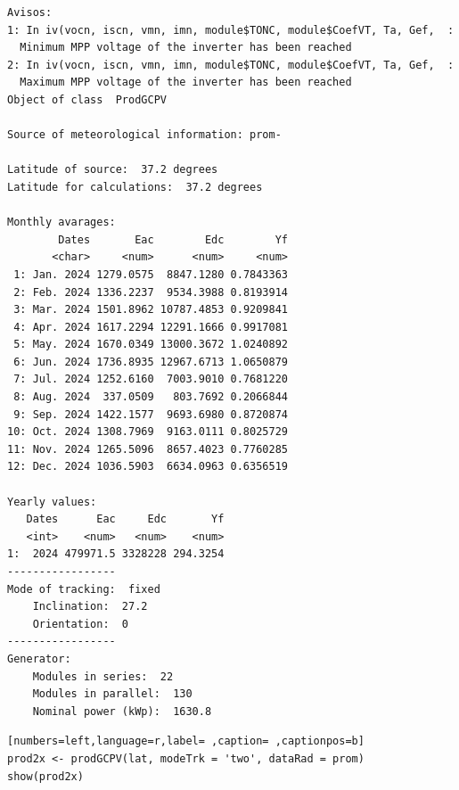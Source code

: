\begin{verbatim}
Avisos:
1: In iv(vocn, iscn, vmn, imn, module$TONC, module$CoefVT, Ta, Gef,  :
  Minimum MPP voltage of the inverter has been reached
2: In iv(vocn, iscn, vmn, imn, module$TONC, module$CoefVT, Ta, Gef,  :
  Maximum MPP voltage of the inverter has been reached
Object of class  ProdGCPV 

Source of meteorological information: prom- 

Latitude of source:  37.2 degrees
Latitude for calculations:  37.2 degrees

Monthly avarages:
        Dates       Eac        Edc        Yf
       <char>     <num>      <num>     <num>
 1: Jan. 2024 1279.0575  8847.1280 0.7843363
 2: Feb. 2024 1336.2237  9534.3988 0.8193914
 3: Mar. 2024 1501.8962 10787.4853 0.9209841
 4: Apr. 2024 1617.2294 12291.1666 0.9917081
 5: May. 2024 1670.0349 13000.3672 1.0240892
 6: Jun. 2024 1736.8935 12967.6713 1.0650879
 7: Jul. 2024 1252.6160  7003.9010 0.7681220
 8: Aug. 2024  337.0509   803.7692 0.2066844
 9: Sep. 2024 1422.1577  9693.6980 0.8720874
10: Oct. 2024 1308.7969  9163.0111 0.8025729
11: Nov. 2024 1265.5096  8657.4023 0.7760285
12: Dec. 2024 1036.5903  6634.0963 0.6356519

Yearly values:
   Dates      Eac     Edc       Yf
   <int>    <num>   <num>    <num>
1:  2024 479971.5 3328228 294.3254
-----------------
Mode of tracking:  fixed 
    Inclination:  27.2 
    Orientation:  0 
-----------------
Generator:
    Modules in series:  22 
    Modules in parallel:  130 
    Nominal power (kWp):  1630.8
\end{verbatim}

\begin{lstlisting}[numbers=left,language=r,label= ,caption= ,captionpos=b]
prod2x <- prodGCPV(lat, modeTrk = 'two', dataRad = prom)
show(prod2x)
\end{lstlisting}

